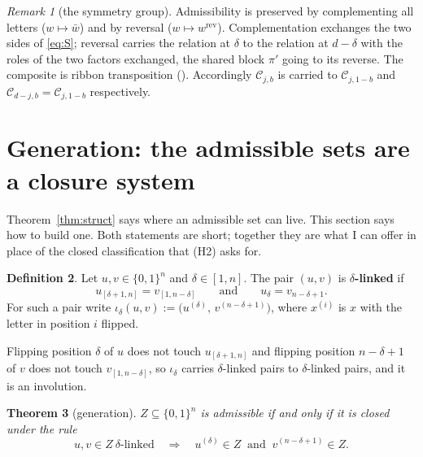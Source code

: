 \documentclass[11pt]{article}
\newtheorem{theorem}{Theorem}[section]
\theoremstyle{definition}
\newtheorem{definition}[theorem]{Definition}
\theoremstyle{remark}
\newtheorem{remark}[theorem]{Remark}
\newcommand{\Cset}{\mathcal{C}}
\newcommand{\cube}{\{0,1\}}
\begin{document}
\begin{remark}[the symmetry group]\label{rem:sym}
Admissibility is preserved by complementing all letters ($w\mapsto\bar w$) and by reversal
($w\mapsto w^{\mathrm{rev}}$).  Complementation exchanges the two sides of \eqref{eq:S};
reversal carries the relation at $\delta$ to the relation at $d-\delta$ with the roles of the
two factors exchanged, the shared block $\pi'$ going to its reverse.  The composite is ribbon
transposition (\cite[Lemma 1.6]{Q149}).  Accordingly $\Cset_{j,b}$ is carried to
$\Cset_{j,1-b}$ and $\Cset_{d-j,b}=\Cset_{j,1-b}$ respectively.
\end{remark}

\section{Generation: the admissible sets are a closure system}\label{sec:closure}

Theorem~\ref{thm:struct} says where an admissible set can live.  This section says how to
build one.  Both statements are short; together they are what I can offer in place of the closed
classification that (H2) asks for.

\begin{definition}\label{def:linked}
Let $u,v\in\cube^{n}$ and $\delta\in[1,n]$.  The pair $(u,v)$ is \textbf{$\delta$-linked} if
\[
   u_{[\delta+1,n]}=v_{[1,n-\delta]}\qquad\text{and}\qquad u_\delta=v_{n-\delta+1}.
\]
For such a pair write $\iota_\delta(u,v):=\bigl(u^{(\delta)},\,v^{(n-\delta+1)}\bigr)$, where
$x^{(i)}$ is $x$ with the letter in position $i$ flipped.
\end{definition}

Flipping position $\delta$ of $u$ does not touch $u_{[\delta+1,n]}$ and flipping position
$n-\delta+1$ of $v$ does not touch $v_{[1,n-\delta]}$, so $\iota_\delta$ carries $\delta$-linked
pairs to $\delta$-linked pairs, and it is an involution.

\begin{theorem}[generation]\label{thm:closure}
$Z\subseteq\cube^{n}$ is admissible if and only if it is closed under the rule
\begin{equation}\label{eq:rule}\tag{R}
   u,v\in Z\ \text{$\delta$-linked}\quad\Longrightarrow\quad
   u^{(\delta)}\in Z\ \text{ and }\ v^{(n-\delta+1)}\in Z .
\end{equation}
\end{theorem}
\end{document}
